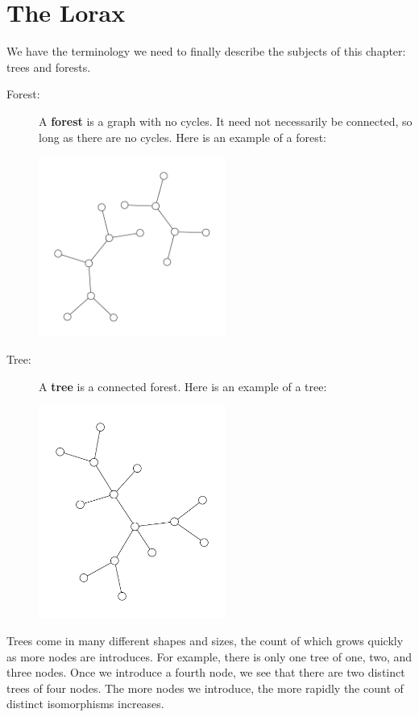 \section{The Lorax}
We have the terminology we need to finally describe the subjects of this chapter: trees and forests. 
\begin{description}
    \item[Forest:] A \textbf{forest} is a graph with no cycles. It need not necessarily be connected, so long as there are no cycles. Here is an example of a forest:
    \begin{center}
        \includegraphics[width=0.5\textwidth]{Chapter2/forest.pdf}
    \end{center} 
    \item[Tree:] A \textbf{tree} is a connected forest. Here is an example of a tree:
    \begin{center}
        \includegraphics[width=0.5\textwidth]{Chapter2/tree.pdf}
    \end{center} 
\end{description}
Trees come in many different shapes and sizes, the count of which grows quickly as more nodes are introduces. For example, there is only one tree of one, two, and three nodes. Once we introduce a fourth node, we see that there are two distinct trees of four nodes. The more nodes we introduce, the more rapidly the count of distinct isomorphisms increases. 

